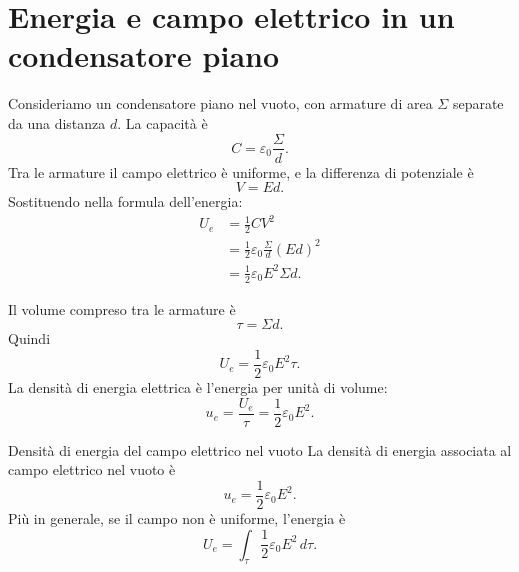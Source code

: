 \documentclass[a4paper]{article}
\begin{document}
\begin{center}
\end{center}

\section{Energia e campo elettrico in un condensatore piano}

Consideriamo un condensatore piano nel vuoto, con armature di area \(\Sigma\) separate da una distanza \(d\). La capacità è
\[
    C=\varepsilon_0\frac{\Sigma}{d}.
\]
Tra le armature il campo elettrico è uniforme, e la differenza di potenziale è
\[
    V=Ed.
\]
Sostituendo nella formula dell'energia:
\begin{align*}
    U_e
    &=\frac{1}{2}CV^2 \\
    &=\frac{1}{2}\varepsilon_0\frac{\Sigma}{d}(Ed)^2 \\
    &=\frac{1}{2}\varepsilon_0E^2\Sigma d.
\end{align*}

Il volume compreso tra le armature è
\[
    \tau=\Sigma d.
\]
Quindi
\[
    U_e=\frac{1}{2}\varepsilon_0E^2\tau.
\]
La densità di energia elettrica è l'energia per unità di volume:
\[
    u_e=\frac{U_e}{\tau}=\frac{1}{2}\varepsilon_0E^2.
\]

\begin{snippettheorem}{Densità di energia del campo elettrico nel vuoto}
    La densità di energia associata al campo elettrico nel vuoto è
    \[
        u_e=\frac{1}{2}\varepsilon_0E^2.
    \]
    Più in generale, se il campo non è uniforme, l'energia è
    \[
        U_e=\int_\tau\frac{1}{2}\varepsilon_0E^2\,d\tau.
    \]
\end{snippettheorem}

\begin{center}
\end{center}
\end{document}
